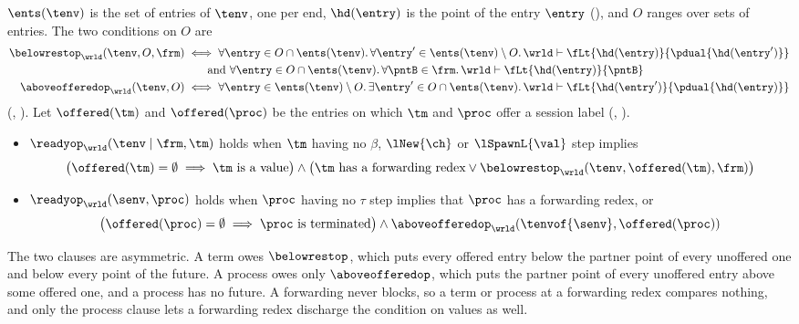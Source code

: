 \begin{definition}
\label{def:ready}
  $\ents(\tenv)$ is the set of entries of $\tenv$, one per end,
  $\hd(\entry)$ is the point of the entry $\entry$ (),
  and $O$ ranges over sets of entries. The two conditions on $O$ are
  \begin{align*}
    \belowrestop_{\wrld}(\tenv, O, \frm)
      &\iff
      \forall \entry \in O \cap \ents(\tenv) \st
        \forall \entry' \in \ents(\tenv) \setminus O \st
          \wrld \types \fLt{\hd(\entry)}{\pdual{\hd(\entry')}}
    \\
      &\qquad \text{and }
      \forall \entry \in O \cap \ents(\tenv) \st
        \forall \pntB \in \frm \st
          \wrld \types \fLt{\hd(\entry)}{\pntB}
    \\
    \aboveofferedop_{\wrld}(\tenv, O)
      &\iff
      \forall \entry \in \ents(\tenv) \setminus O \st
        \exists \entry' \in O \cap \ents(\tenv) \st
          \wrld \types \fLt{\hd(\entry')}{\pdual{\hd(\entry)}}
  \end{align*}
  (, ). Let $\offered(\tm)$ and
  $\offered(\proc)$ be the entries on which $\tm$ and $\proc$ offer a
  session label (, ).
  \begin{itemize}
    \item $\readyop_{\wrld}(\tenv \mid \frm, \tm)$ holds when $\tm$
      having no $\beta$, $\lNew{\ch}$ or $\lSpawnL{\val}$ step implies
      \[
        \big(\offered(\tm) = \emptyset \implies \tm \text{ is a value}\big)
        \land
        \big(\tm \text{ has a forwarding redex} \lor
          \belowrestop_{\wrld}(\tenv, \offered(\tm), \frm)\big)
      \]
    \item $\readyop_{\wrld}(\senv, \proc)$ holds when $\proc$ having no
      $\tau$ step implies that $\proc$ has a forwarding redex, or
      \[
        \big(\offered(\proc) = \emptyset \implies
          \proc \text{ is terminated}\big)
        \land
        \aboveofferedop_{\wrld}(\tenvof{\senv}, \offered(\proc))
      \]
  \end{itemize}
\end{definition}

The two clauses are asymmetric. A term owes $\belowrestop$, which puts
every offered entry below the partner point of every unoffered one and
below every point of the future. A process owes only $\aboveofferedop$,
which puts the partner point of every unoffered entry above some offered
one, and a process has no future. A
forwarding never blocks, so a term or process at a forwarding redex
compares nothing, and only the process clause lets a forwarding redex
discharge the condition on values as well.

